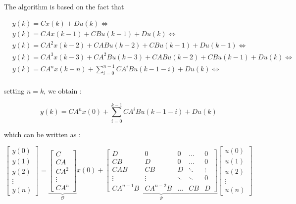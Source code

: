 \documentclass{article}
\begin{document}
The algorithm is based on the fact that 

\begin{align}
& y(k) = Cx(k) + Du(k) \Leftrightarrow \\
& y(k) = CAx(k-1) + CBu(k-1) + Du(k) \Leftrightarrow \\
& y(k) =  CA^2x(k-2) + CABu(k-2) + CBu(k-1) + Du(k-1) \Leftrightarrow \\ 
& y(k) = CA^3x(k-3) + CA^2Bu(k-3) + CABu(k-2) + CBu(k-1) + Du(k) \Leftrightarrow \\
& y(k) = CA^nx(k-n) + \sum_{i=0}^{n-1} CA^iBu(k-1-i) + Du(k) \Leftrightarrow \\
\end{align}

\noindent setting $n=k$, we obtain : 

\begin{equation}
y(k) = CA^nx(0) + \sum_{i=0}^{k-1} CA^iBu(k-1-i) + Du(k)
\end{equation}

\noindent which can be written as : 

\[
\left[ \begin{array}{c}
y(0) \\
y(1) \\
y(2) \\
\vdots \\
y(n)
\end{array} \right]
%
= \underbrace{\left[ \begin{array}{c}
C \\
CA \\
CA^2 \\
\vdots \\
CA^n
\end{array} \right]}_{\mathcal{O}}
%
x(0)
%
+ \underbrace{\left[ \begin{array}{ccccc}
D & 0 & 0 & \dots & 0\\
CB & D & 0 & \dots & 0\\
CAB & CB & D & \ddots & \vdots \\
\vdots & \vdots & \ddots & \ddots  & 0\\
CA^{n-1}B & CA^{n-2}B & \dots & CB & D
\end{array} \right]}_{\Psi}
%
\left[ \begin{array}{cc}
u(0) \\
u(1) \\
u(2) \\
\vdots \\
u(n)
\end{array} \right]
\]
\end{document}
